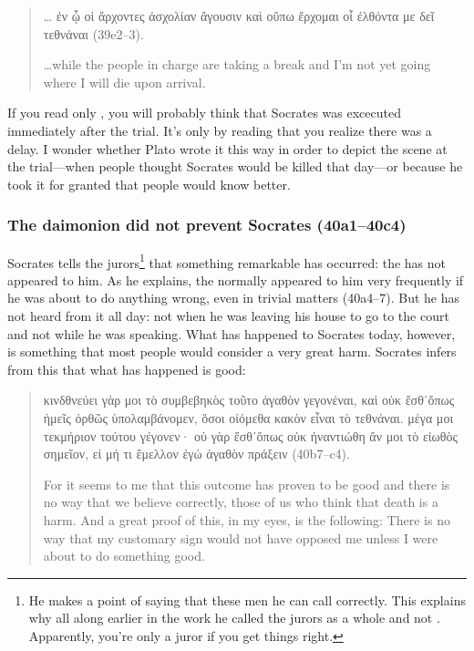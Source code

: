 \documentclass[11pt]{article}
\begin{document}
\begin{quote}

    \dots
    {\g
    ἐν ᾧ οἱ ἄρχοντες ἀσχολίαν ἄγουσιν καὶ οὔπω ἔρχομαι οἷ ἐλθόντα με
    δεῖ τεθνάναι
    } (39e2--3).

    \dots while the people in charge are taking a break and I'm not yet
    going where I will die upon arrival.

\end{quote}

If you read only , you will probably think that Socrates was
excecuted immediately after the trial.  It's only by reading 
that you realize there was a delay.  I wonder whether Plato wrote it this
way in order to depict the scene at the trial---when people thought
Socrates would be killed that day---or because he took it for granted that
people would know better.

\subsubsection{The daimonion did not prevent Socrates (40a1--40c4)}

Socrates tells the jurors\footnote{He makes a point of saying that these
men he can call  correctly.  This explains why all along
earlier in the work he called the jurors as a whole 
and not .  Apparently, you're only a juror if you get things
right.} that something remarkable has occurred: the  has
not appeared to him.  As he explains, the  normally
appeared to him very frequently if he was about to do anything wrong, even
in trivial matters (40a4--7).  But he has not heard from it all day: not
when he was leaving his house to go to the court and not while he was
speaking.  What has happened to Socrates today, however, is something that
most people would consider a very great harm.  Socrates infers from this
that what has happened is good:

\begin{quote}

    {\g
    κινδθνεύει γὰρ μοι τὸ συμβεβηκὸς τοῦτο ἀγαθὸν γεγονέναι, καὶ οὐκ
    ἔσθ᾽ὅπως ἡμεῖς ὀρθῶς ὑπολαμβάνομεν, ὅσοι οἰόμεθα κακὸν εἶναι τὸ
    τεθνάναι.  μέγα μοι τεκμήριον τούτου γέγονεν· οὐ γὰρ ἔσθ᾽ὅπως οὐκ
    ἠναντιώθη ἄν μοι τὸ εἰωθὸς σημεῖον, εἰ μή τι ἔμελλον ἐγώ ἀγαθὸν πράξειν
    } (40b7--c4).

    For it seems to me that this outcome has proven to be good and there is
    no way that we believe correctly, those of us who think that death is
    a harm.  And a great proof of this, in my eyes, is the following: There
    is no way that my customary sign would not have opposed me unless
    I were about to do something good.

\end{quote}
\end{document}
